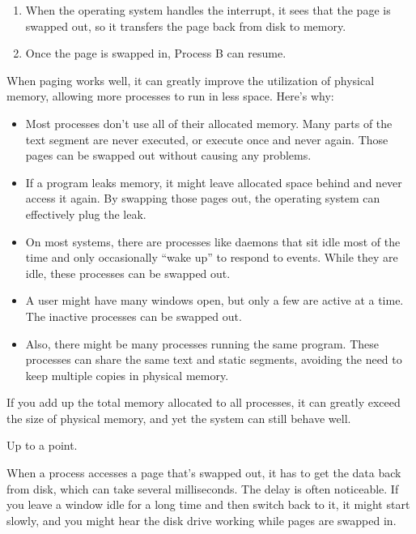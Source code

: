 \documentclass[12pt]{book}
\begin{document}
{\begin{enumerate}
\item When the operating system handles the interrupt, it sees that
the page is swapped out, so it transfers the page back from disk to
memory.  

\item Once the page is swapped in, Process B can resume.

\end{enumerate}

When paging works well, it can greatly improve the utilization of
physical memory, allowing more processes to run in less space.
Here's why:

\begin{itemize}

\item Most processes don't use all of their allocated memory.  Many
  parts of the text segment are never executed, or execute once and
  never again.  Those pages can be swapped out without causing any
  problems.

\item If a program leaks memory, it might leave allocated space behind
  and never access it again.  By swapping those pages out, the
  operating system can effectively plug the leak.

\item On most systems, there are processes like daemons that sit idle
  most of the time and only occasionally ``wake up'' to respond to
  events.  While they are idle, these processes can be swapped out.

\item A user might have many windows open, but only a few are active
  at a time.  The inactive processes can be swapped out.

\item Also, there might be many processes running the same program.
  These processes can share the same text and static segments, avoiding the need to keep multiple copies in physical memory.

\end{itemize}

If you add up the total memory allocated to all processes, it can
greatly exceed the size of physical memory, and yet the system can
still behave well.

Up to a point.

When a process accesses a page that's swapped out, it has to get the
data back from disk, which can take several milliseconds.  The
delay is often noticeable.  If you leave a window idle for a long
time and then switch back to it, it might start slowly,
and you might hear the disk drive working while pages are
swapped in.  

}
\end{document}
